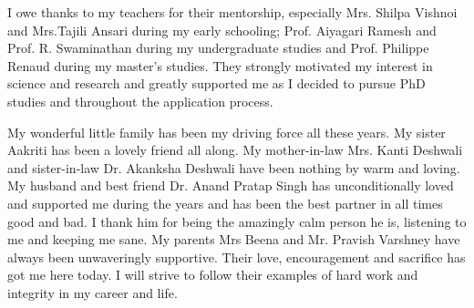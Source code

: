 I owe thanks to my teachers for their mentorship, especially Mrs. Shilpa Vishnoi and Mrs.Tajili Ansari during my early schooling; Prof. Aiyagari Ramesh and Prof. R. Swaminathan during my undergraduate studies and Prof. Philippe Renaud during my master's studies. They strongly motivated my interest in science and research and greatly supported me as I decided to pursue PhD studies and throughout the application process.  

My wonderful little family has been my driving force all these years. My sister Aakriti has been a lovely friend all along. My mother-in-law Mrs. Kanti Deshwali and sister-in-law Dr. Akanksha Deshwali have been nothing by warm and loving. My husband and best friend Dr. Anand Pratap Singh has unconditionally loved and supported me during the years and has been the best partner in all times good and bad. I thank him for being the amazingly calm person he is, listening to me and keeping me sane. My parents Mrs Beena and Mr. Pravish Varshney have always been unwaveringly supportive. Their love, encouragement and sacrifice has got me here today. I will strive to follow their examples of hard work and integrity in my career and life.